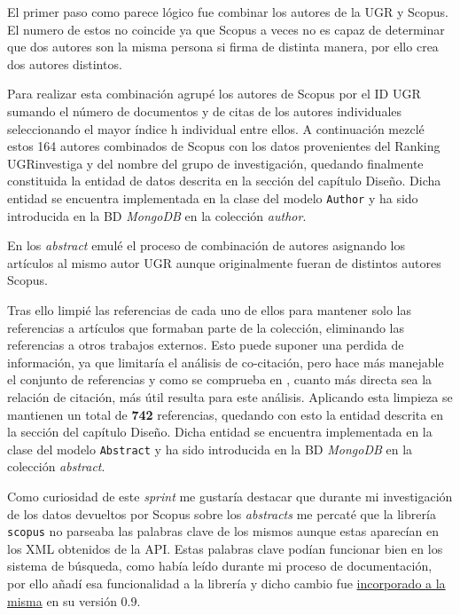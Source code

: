 El primer paso como parece lógico fue combinar los autores de la \acrshort{UGR} y Scopus. El numero de estos no coincide ya que Scopus a veces no es capaz de determinar que dos autores son la misma persona si firma de distinta manera, por ello crea dos autores distintos.

Para realizar esta combinación agrupé los autores de Scopus por el ID \acrshort{UGR} sumando el número de documentos y de citas de los autores individuales seleccionando el mayor índice h individual entre ellos. A continuación mezclé estos 164 autores combinados de Scopus con los datos provenientes del Ranking UGRinvestiga y del nombre del grupo de investigación, quedando finalmente constituida la entidad de datos descrita en la sección  del capítulo Diseño. Dicha entidad se encuentra implementada en la clase del modelo \texttt{Author} y ha sido introducida en la \acrshort{BD} \textit{MongoDB} en la colección \textit{author}.

En los \textit{abstract} emulé el proceso de combinación de autores asignando los artículos al mismo autor \acrshort{UGR} aunque originalmente fueran de distintos autores Scopus. 

Tras ello limpié las referencias de cada uno de ellos para mantener solo las referencias a artículos que formaban parte de la colección, eliminando las referencias a otros trabajos externos. Esto puede suponer una perdida de información, ya que limitaría el análisis de co-citación, pero hace más manejable el conjunto de referencias y como se comprueba en \cite{DBLP:conf/ecir/SarolLS18}, cuanto más directa sea la relación de citación, más útil resulta para este análisis. Aplicando esta limpieza se mantienen un total de \textbf{742} referencias, quedando con esto la entidad descrita en la sección  del capítulo Diseño. Dicha entidad se encuentra implementada en la clase del modelo \texttt{Abstract} y ha sido introducida en la \acrshort{BD} \textit{MongoDB} en la colección \textit{abstract}.



Como curiosidad de este \textit{sprint} me gustaría destacar que durante mi investigación de los datos devueltos por Scopus sobre los \textit{abstracts} me percaté que la librería \texttt{scopus} no parseaba las palabras clave de los mismos aunque estas aparecían en los \acrshort{XML} obtenidos de la \acrshort{API}. Estas palabras clave podían funcionar bien en los sistema de búsqueda, como había leído durante mi proceso de documentación, por ello añadí esa funcionalidad a la librería y dicho cambio fue \href{https://github.com/scopus-api/scopus/pull/68}{incorporado a la misma} en su versión 0.9.

